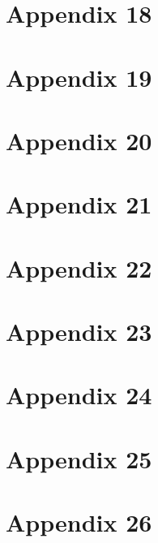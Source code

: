 \chapter{Appendix 18}

\chapter{Appendix 19}

\chapter{Appendix 20}

\chapter{Appendix 21}

\chapter{Appendix 22}

\chapter{Appendix 23}

\chapter{Appendix 24}

\chapter{Appendix 25}

\chapter{Appendix 26}

